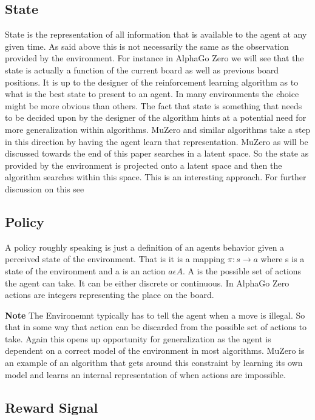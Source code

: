     \subsection{State}
    
    State is the representation of all information that is available to the agent at any given time. As said above this is not necessarily the same as the observation provided by the environment. For instance in AlphaGo Zero we will see that the state is actually a function of the current board as well as previous board positions. It is up to the designer of the reinforcement learning algorithm as to what is the best state to present to an agent. In many environments the choice might be more obvious than others. 
    The fact that state is something that needs to be decided upon by the designer of the algorithm hints at a potential need for more generalization within algorithms. MuZero and similar algorithms take a step in this direction by having the agent learn that representation. MuZero as will be discussed towards the end of this paper searches in a latent space. So the state as provided by the environment is projected onto a latent space and then the algorithm searches within this space. This is an interesting approach. For further discussion on this see \cite{predictron,muzero}
    
    \subsection{Policy}
    
    A policy roughly speaking is just a definition of an agents behavior given a perceived state of the environment. That is it is a mapping $ \pi: s \rightarrow a $ where s is a state of the environment and a is an action  $ a \epsilon A $. A is the possible set of actions the agent can take. It can be either discrete or continuous. In AlphaGo Zero actions are integers representing the place on the board.
    
    \textbf{Note} The Environemnt typically has to tell the agent when a move is illegal. So that in some way that action can be discarded from the possible set of actions to take. Again this opens up opportunity for generalization as the agent is dependent on a correct model of the environment in most algorithms. MuZero is an example of an algorithm that gets around this constraint by learning its own model and learns an internal representation of when actions are impossible. 
    
    \subsection{Reward Signal}
    
